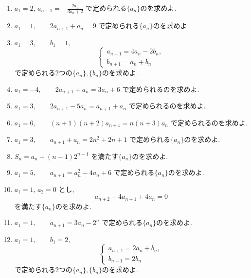 \begin{enumerate}[label=\textbf{問\arabic*.},leftmargin=3.8em,format=\bookitemlink{practice-basic}{problem}{hint}]
    で定められるのを求めよ.
  \item $a_1=2,\,a_{n+1}=-\frac{2a_n}{3a_n+2}$
    で定められる$\{a_n\}$のを求めよ.
  \item $a_1=1,\qquad 2a_{n+1}+a_n=9$
    で定められる$\{a_n\}$のを求めよ.
  \item $a_1=3,\qquad b_1=1,$
    \[
      \begin{cases}
        a_{n+1}=4a_n-2b_n,\\
        b_{n+1}=a_n+b_n
      \end{cases}
    \]
    で定められる2つの$\{a_n\},\{b_n\}$のを求めよ.
  \item $a_1=-4,\qquad 2a_{n+1}+a_n=3a_n+6$
    で定められるのを求めよ.
  \item $a_1=3,\qquad 2a_{n+1}-5a_n=a_{n+1}+a_n$
    で定められるのを求めよ.
  \item $a_1=6,\qquad
      (n+1)(n+2)a_{n+1}=n(n+3)a_n$
    で定められるのを求めよ.
  \item $a_1=3,\qquad a_{n+1}+a_n=2n^2+2n+1$
    で定められる$\{a_n\}$のを求めよ.
  \item $S_n=a_n+(n-1)2^{n-1}$
    を満たす$\{a_n\}$のを求めよ.
  \item $a_1=5,\qquad a_{n+1}=a_n^2-4a_n+6$
    で定められる$\{a_n\}$のを求めよ.
  \item $a_1=1,\,a_2=0$ とし,
    \[
      a_{n+2}-4a_{n+1}+4a_n=0
    \]
    を満たす$\{a_n\}$のを求めよ.
  \item $a_1=1,\qquad a_{n+1}=3a_n-2^n$
    で定められる$\{a_n\}$のを求めよ.
  \item $a_1=1,\qquad b_1=2,$
    \[
      \begin{cases}
        a_{n+1}=2a_n+b_n,\\
        b_{n+1}=2b_n
      \end{cases}
    \]
    で定められる2つの$\{a_n\},\{b_n\}$のを求めよ.

\end{enumerate}
